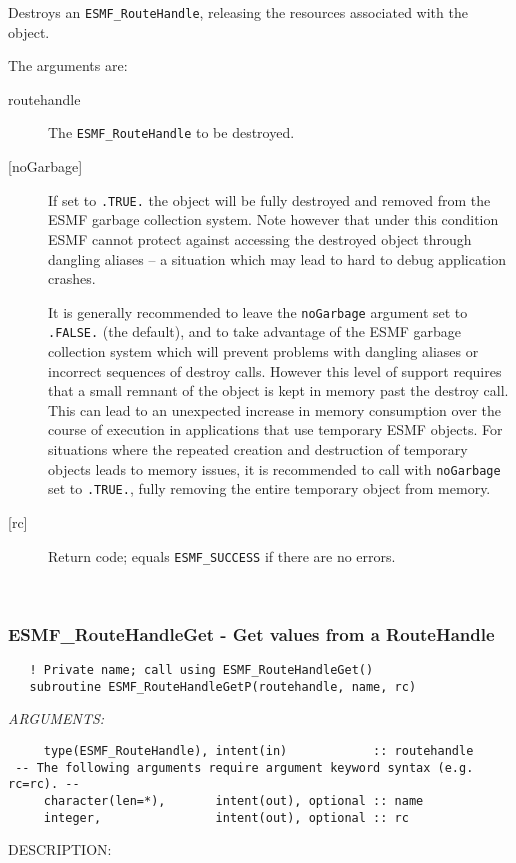      Destroys an {\tt ESMF\_RouteHandle}, releasing the resources associated
     with the object.
  
     The arguments are:
     \begin{description}
     \item[routehandle] 
       The {\tt ESMF\_RouteHandle} to be destroyed.
     \item[{[noGarbage]}]
       If set to {\tt .TRUE.} the object will be fully destroyed and removed
       from the ESMF garbage collection system. Note however that under this 
       condition ESMF cannot protect against accessing the destroyed object 
       through dangling aliases -- a situation which may lead to hard to debug 
       application crashes.
   
       It is generally recommended to leave the {\tt noGarbage} argument
       set to {\tt .FALSE.} (the default), and to take advantage of the ESMF 
       garbage collection system which will prevent problems with dangling
       aliases or incorrect sequences of destroy calls. However this level of
       support requires that a small remnant of the object is kept in memory
       past the destroy call. This can lead to an unexpected increase in memory
       consumption over the course of execution in applications that use 
       temporary ESMF objects. For situations where the repeated creation and 
       destruction of temporary objects leads to memory issues, it is 
       recommended to call with {\tt noGarbage} set to {\tt .TRUE.}, fully 
       removing the entire temporary object from memory.
     \item[{[rc]}] 
       Return code; equals {\tt ESMF\_SUCCESS} if there are no errors.
     \end{description}
   
 
\mbox{}\hrulefill\ 
 
\subsubsection [ESMF\_RouteHandleGet] {ESMF\_RouteHandleGet - Get values from a RouteHandle}


 
\begin{verbatim}   ! Private name; call using ESMF_RouteHandleGet()
   subroutine ESMF_RouteHandleGetP(routehandle, name, rc)\end{verbatim}{\em ARGUMENTS:}
\begin{verbatim}     type(ESMF_RouteHandle), intent(in)            :: routehandle
 -- The following arguments require argument keyword syntax (e.g. rc=rc). --
     character(len=*),       intent(out), optional :: name
     integer,                intent(out), optional :: rc
 \end{verbatim}
{\sf DESCRIPTION:\\ }


